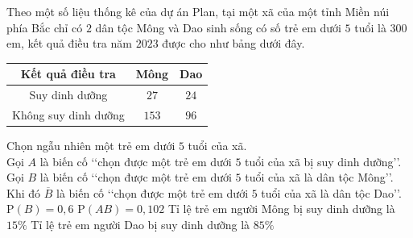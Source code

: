 \begin{ex}%
	Theo một số liệu thống kê của dự án Plan, tại một xã của một tỉnh Miền núi phía Bắc chỉ có $2$ dân tộc Mông và Dao sinh sống có số trẻ em dưới $5$ tuổi là $300$ em, kết quả điều tra năm $2023$ được cho như bảng  dưới đây.
	\begin{center}
		\begin{tabular}{|c|c|c| }
			\hline 
			Kết quả điều tra & Mông  & Dao\\
			 \hline
			Suy dinh  dưỡng & $27$ & $24$\\
			 \hline
			 Không suy dinh dưỡng & $153$ & $96$\\
			 \hline
		\end{tabular}
	\end{center}
	Chọn  ngẫu nhiên một trẻ em dưới $5$ tuổi của xã.\\
	Gọi $A$ là biến cố \lq\lq chọn được một trẻ em dưới $5$ tuổi của xã  bị suy dinh dưỡng\rq\rq.\\
	Gọi $B$ là biến cố \lq\lq chọn được một trẻ em dưới $5$ tuổi  của xã là dân tộc Mông\rq\rq.\\
	Khi đó  $\overline{B}$ là biến cố \lq\lq chọn được một trẻ em dưới $5$ tuổi của xã là dân tộc Dao\rq\rq.
	 \choiceTF
		{\True $\mathrm{P}(B)=0{,}6$} 
		{$\mathrm{P}(AB)=0{,}102$} 
		 {\True Tỉ lệ trẻ em người Mông bị suy dinh dưỡng là $15\%$}
		{Tỉ lệ trẻ em người Dao bị suy dinh dưỡng là $85\%$} 
\end{ex}

